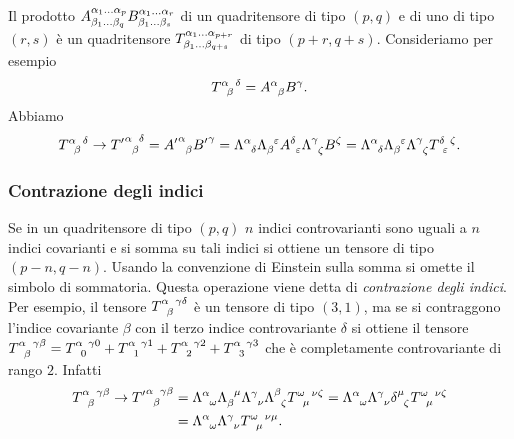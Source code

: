 Il prodotto
$\tensor*{A}{^{\alpha_{1}\dots\alpha_{p}}_{\beta_{1}\dots\beta_{q}}}
\tensor*{B}{^{\alpha_{1}\dots\alpha_{r}}_{\beta_{1}\dots\beta_{s}}}$
di un quadritensore di tipo $(p,q)$ e di uno di tipo $(r,s)$ è un quadritensore
$\tensor*{T}{^{\alpha_{1}\dots\alpha_{p+r}}_{\beta_{1}\dots\beta_{q+s}}}$ di
tipo $(p+r,q+s)$.  Consideriamo per esempio
\begin{equation}
  \tensor{T}{^{\alpha}_{\beta}^{\delta}} = \tensor{A}{^{\alpha}_{\beta}}
  \tensor{B}{^{\gamma}}.
\end{equation}
Abbiamo
\begin{equation}
  \tensor{T}{^{\alpha}_{\beta}^{\delta}} \to
  \tensor{{T'}}{^{\alpha}_{\beta}^{\delta}} = \tensor{{A'}}{^{\alpha}_{\beta}}
  \tensor{{B'}}{^{\gamma}} = \tensor{\Lambda}{^{\alpha}_{\delta}}
  \tensor{\Lambda}{_{\beta}^{\epsilon}} \tensor{A}{^{\delta}_{\epsilon}}
  \tensor{\Lambda}{^{\gamma}_{\zeta}} \tensor{B}{^{\zeta}} =
  \tensor{\Lambda}{^{\alpha}_{\delta}} \tensor{\Lambda}{_{\beta}^{\epsilon}}
  \tensor{\Lambda}{^{\gamma}_{\zeta}} \tensor{T}{^{\delta}_{\epsilon}^{\zeta}}.
\end{equation}

\subsubsection{Contrazione degli indici}
\label{sec:contrazione-indice}

Se in un quadritensore di tipo $(p,q)$ $n$ indici controvarianti sono uguali a
$n$ indici covarianti e si somma su tali indici si ottiene un tensore di tipo
$(p-n,q-n)$.  Usando la convenzione di Einstein sulla somma si omette il simbolo
di sommatoria.  Questa operazione viene detta di
\emph{contrazione degli indici}.  Per esempio, il tensore
$\tensor{T}{^{\alpha}_{\beta}^{\gamma\delta}}$ è un tensore di tipo $(3,1)$, ma
se si contraggono l'indice covariante $\beta$ con il terzo indice controvariante
$\delta$ si ottiene il tensore
$\tensor{T}{^{\alpha}_{\beta}^{\gamma\beta}} =
\tensor{T}{^{\alpha}_{0}^{\gamma 0}} + \tensor{T}{^{\alpha}_{1}^{\gamma 1}} +
\tensor{T}{^{\alpha}_{2}^{\gamma 2}} + \tensor{T}{^{\alpha}_{3}^{\gamma 3}}$
che è completamente controvariante di rango $2$.  Infatti
\begin{equation}
  \begin{split}
    \tensor{T}{^{\alpha}_{\beta}^{\gamma\beta}} \to
    \tensor{{T'}}{^{\alpha}_{\beta}^{\gamma\beta}} &=
    \tensor{\Lambda}{^{\alpha}_{\omega}} \tensor{\Lambda}{_{\beta}^{\mu}}
    \tensor{\Lambda}{^{\gamma}_{\nu}} \tensor{\Lambda}{^{\beta}_{\zeta}}
    \tensor{T}{^{\omega}_{\mu}^{\nu\zeta}} =
    \tensor{\Lambda}{^{\alpha}_{\omega}} \tensor{\Lambda}{^{\gamma}_{\nu}}
    \tensor{\delta}{^{\mu}_{\zeta}} \tensor{T}{^{\omega}_{\mu}^{\nu\zeta}} \\
    &= \tensor{\Lambda}{^{\alpha}_{\omega}} \tensor{\Lambda}{^{\gamma}_{\nu}}
    \tensor{T}{^{\omega}_{\mu}^{\nu\mu}}.
  \end{split}
\end{equation}

